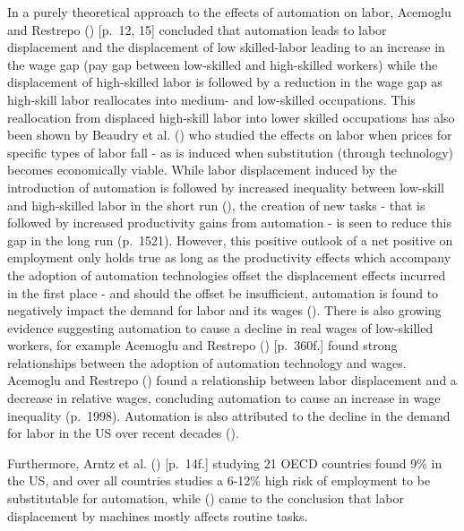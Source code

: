 \documentclass[
  11,
  a4paperpaper,
]{article}
\begin{document}
In a purely theoretical approach to the effects of automation on labor,
Acemoglu and Restrepo ()
{[}p.~12, 15{]} concluded that automation leads to labor displacement
and the displacement of low skilled-labor leading to an increase in the
wage gap (pay gap between low-skilled and high-skilled workers) while
the displacement of high-skilled labor is followed by a reduction in the
wage gap as high-skill labor reallocates into medium- and low-skilled
occupations. This reallocation from displaced high-skill labor into
lower skilled occupations has also been shown by Beaudry et al.
() who studied the effects
on labor when prices for specific types of labor fall - as is induced
when substitution (through technology) becomes economically viable.
While labor displacement induced by the introduction of automation is
followed by increased inequality between low-skill and high-skilled
labor in the short run (), the creation of new tasks - that is followed
by increased productivity gains from automation - is seen to reduce this
gap in the long run (p.~1521). However, this positive outlook of a net
positive on employment only holds true as long as the productivity
effects which accompany the adoption of automation technologies offset
the displacement effects incurred in the first place - and should the
offset be insufficient, automation is found to negatively impact the
demand for labor and its wages
(). There is also growing evidence suggesting automation to cause
a decline in real wages of low-skilled workers, for example Acemoglu and
Restrepo () {[}p.~360f.{]}
found strong relationships between the adoption of automation technology
and wages. Acemoglu and Restrepo
() found a relationship
between labor displacement and a decrease in relative wages, concluding
automation to cause an increase in wage inequality (p.~1998). Automation
is also attributed to the decline in the demand for labor in the US over
recent decades ().

Furthermore, Arntz et al. ()
{[}p.~14f.{]} studying 21 OECD countries found 9\% in the US, and over
all countries studies a 6-12\% high risk of employment to be
substitutable for automation, while
()
came to the conclusion that labor displacement by machines mostly
affects routine tasks.
\end{document}
